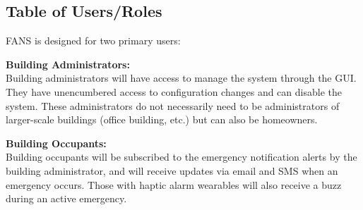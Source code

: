 \subsection{Table of Users/Roles}

FANS is designed for two primary users:

\textbf{Building Administrators:} \\
Building administrators will have access to manage the system through the GUI. They have unencumbered access to configuration changes and can disable the system. These administrators do not necessarily need to be administrators of larger-scale buildings (office building, etc.) but can also be homeowners.

\textbf{Building Occupants:} \\
Building occupants will be subscribed to the emergency notification alerts by the building administrator, and will receive updates via email and SMS when an emergency occurs. Those with haptic alarm wearables will also receive a buzz during an active emergency.
